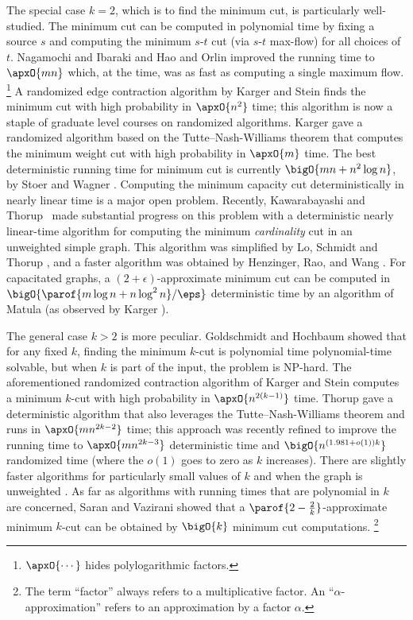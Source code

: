 \documentclass[11pt]{article}
\numberwithin{equation}{section}
\theoremstyle{definition}
\theoremstyle{plain}
\begin{document}
The special case $k = 2$, which is to find the minimum cut, is
particularly well-studied. The minimum cut can be computed in
polynomial time by fixing a source $s$ and computing the minimum
$s$-$t$ cut (via $s$-$t$ max-flow) for all choices of $t$. Nagamochi
and
Ibaraki %
\cite{ni-92-sidm,ni-92-algorithmica} %
and Hao and Orlin \cite{ho-94} improved the running time to
$\apxO{m n}$ which, at the time, was as fast as computing a single
maximum flow.%
\footnote{$\apxO{\cdots}$ hides polylogarithmic factors.} %
A randomized edge contraction algorithm by Karger and Stein
\cite{ks-96} finds the minimum cut with high probability in
$\apxO{n^2}$ time; this algorithm is now a staple of graduate level
courses on randomized algorithms. Karger \cite{karger-00} gave a
randomized algorithm based on the Tutte--Nash-Williams theorem
\cite{n-61,t-61} that computes the minimum weight cut with high
probability in $\apxO{m}$ time. The best deterministic running time
for minimum cut is currently $\bigO{m n + n^2 \log n}$, by Stoer and
Wagner \cite{sw-97}.  Computing the minimum capacity cut
deterministically in nearly linear time is a major open problem.
Recently, Kawarabayashi and Thorup~\cite{kt-15} made substantial
progress on this problem with a
deterministic %
nearly linear-time %
algorithm for computing the minimum \emph{cardinality} cut in an
unweighted simple graph. This algorithm was simplified by Lo, Schmidt
and Thorup \cite{lst}, and a faster algorithm was obtained by
Henzinger, Rao, and Wang \cite{hrw-17}. For capacitated graphs, a
$(2+\epsilon)$-approximate minimum cut can be computed in
\begin{math}
  \bigO{\parof{m \log n + n \log^2 n}/{\eps}}
\end{math}
deterministic time by an algorithm of Matula \cite{matula} (as
observed by Karger \cite{karger}).

The general case $k > 2$ is more peculiar. Goldschmidt and Hochbaum
\cite{gh-94} showed that for any fixed $k$, finding the minimum
$k$-cut is polynomial time polynomial-time
solvable, but when $k$ is part of the
input, the problem is %
NP-hard.  %
The aforementioned randomized
contraction algorithm of Karger and Stein \cite{ks-96} computes a
minimum $k$-cut with high probability in
\begin{math}
  \apxO{n^{2(k-1)}}
\end{math}
time. Thorup \cite{thorup-08} gave a deterministic algorithm that also
leverages the Tutte--Nash-Williams theorem \cite{n-61,t-61} and runs
in $\apxO{m n^{2k -2}}$ time; this approach was recently refined to
improve the running time to $\apxO{m n^{2k-3}}$ deterministic time
\cite{cqx} and $\bigO{n^{(1.981 + o(1))k}}$ randomized time
\cite{gll-19} (where the $o(1)$ goes to zero as $k$ increases). There
are slightly faster algorithms for particularly small values of $k$
\cite{levine} and when the graph is unweighted \cite{gll-18-focs}.  As
far as algorithms with running times that are polynomial in $k$ are
concerned, Saran and Vazirani \cite{sv-95} showed that a
$\parof{2 - \frac{2}{k}}$-approximate
minimum %
$k$-cut can be obtained by $\bigO{k}$ minimum cut computations.
%
%
%
%
%
%
%
\footnote{The term ``factor'' always refers to a multiplicative factor.
An ``$\alpha$-approximation'' refers to an approximation
by a factor $\alpha$.}   %
\end{document}

